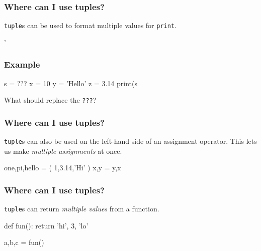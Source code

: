 \documentclass[11pt]{beamer}
\begin{document}
\begin{frame}[fragile]
  \frametitle{Where can I use tuples?}
  \Enlarge

  \begin{itemize}
  \myitem  \texttt{tuple}s can be used to format multiple values for \texttt{print}.
  \end{itemize}
  \begin{semiverbatim}
'%
  \end{semiverbatim}
\end{frame}

\begin{frame}[fragile]
  \frametitle{Example}
  \Enlarge

  \begin{semiverbatim}
s = ???
x = 10
y = 'Hello'
z = 3.14
print(s %
  \end{semiverbatim}
  What should replace the \texttt{???}?
\end{frame}

\begin{frame}[fragile]
  \frametitle{Where can I use tuples?}
  \Enlarge

  \begin{itemize}
  \myitem  \texttt{tuple}s can also be used on the left-hand side of an assignment operator. %
  \myitem  This lets us make \emph{multiple assignments} at once. %
  \end{itemize}
  \begin{semiverbatim}
one,pi,hello = ( 1,3.14,'Hi' )
x,y = y,x
  \end{semiverbatim}
\end{frame}

\begin{frame}[fragile]
  \frametitle{Where can I use tuples?}
  \Enlarge

  \begin{itemize}
  \myitem  \texttt{tuple}s can return \emph{multiple values} from a function. %
  \end{itemize}
  \begin{semiverbatim}
def fun():
    return 'hi', 3, 'lo'

a,b,c = fun()
  \end{semiverbatim}
\end{frame}
\end{document}
